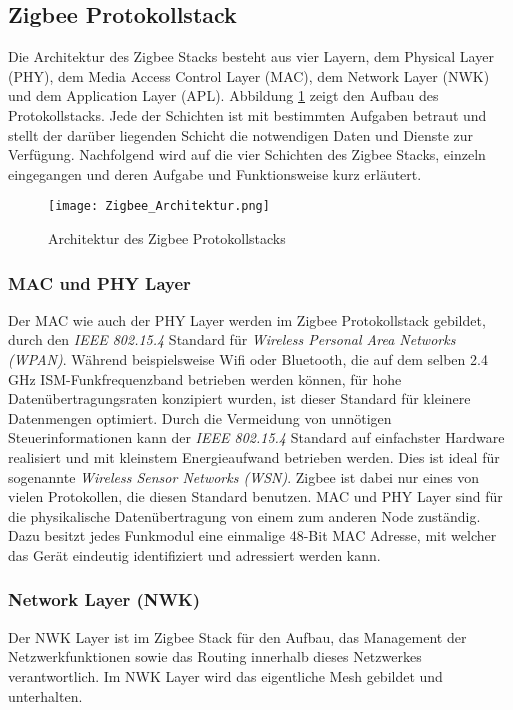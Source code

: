 \subsection{Zigbee Protokollstack}\label{subsec:ZigbeeProtokollStack}
Die Architektur des Zigbee Stacks besteht aus vier Layern, dem Physical Layer (PHY), dem Media Access Control Layer (MAC), dem Network Layer (NWK) und dem Application Layer (APL).
Abbildung \ref{fig:ArchitekturdesZigbeeProtokollStacks} zeigt den Aufbau des Protokollstacks.
Jede der Schichten ist mit bestimmten Aufgaben betraut und stellt der darüber liegenden Schicht die notwendigen Daten und Dienste zur Verfügung.
Nachfolgend wird auf die vier Schichten des Zigbee Stacks, einzeln eingegangen und deren Aufgabe und Funktionsweise kurz erläutert.

\begin{figure}[h]
	\centering
	\texttt{[image: Zigbee\_Architektur.png]}
	\caption{Architektur des Zigbee Protokollstacks}
	\label{fig:ArchitekturdesZigbeeProtokollStacks}
\end{figure}

\subsubsection{MAC und PHY Layer}\label{subsubsec:MACundPHYLayer}
Der MAC wie auch der PHY Layer werden im Zigbee Protokollstack gebildet, durch den \textit{IEEE 802.15.4} Standard für \textit{Wireless Personal Area Networks (WPAN)}.
Während beispielsweise Wifi oder Bluetooth, die auf dem selben 2.4 GHz ISM-Funkfrequenzband betrieben werden können, für hohe Datenübertragungsraten konzipiert wurden, ist dieser Standard für kleinere Datenmengen optimiert.
Durch die Vermeidung von unnötigen Steuerinformationen kann der \textit{IEEE 802.15.4} Standard auf einfachster Hardware realisiert und mit kleinstem Energieaufwand betrieben werden.
Dies ist ideal für sogenannte \textit{Wireless Sensor Networks (WSN)}.
Zigbee ist dabei nur eines von vielen Protokollen, die diesen Standard benutzen.
MAC und PHY Layer sind für die physikalische Datenübertragung von einem zum anderen Node zuständig.
Dazu besitzt jedes Funkmodul eine einmalige 48-Bit MAC Adresse, mit welcher das Gerät eindeutig identifiziert und adressiert werden kann. \cite{markus_krause_rainer_konrad_ieee_2014}


\subsubsection{Network Layer (NWK)}\label{subsubsec:Network Layer}
Der NWK Layer ist im Zigbee Stack für den Aufbau, das Management der Netzwerkfunktionen sowie das Routing innerhalb dieses Netzwerkes verantwortlich.
Im NWK Layer wird das eigentliche Mesh gebildet und unterhalten.

